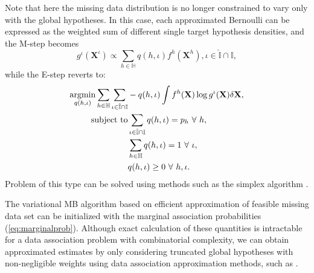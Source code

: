 \documentclass[journal]{IEEEtran}
\begin{document}
Note that here the missing data distribution is no longer constrained to vary only with the global hypotheses. In this case, each approximated Bernoulli can be expressed as the weighted sum of different single target hypothesis densities, and the M-step becomes
\begin{equation}
g^{\iota}(\mathbf{X}^{\iota}) \propto \sum_{h\in\mathbb{H}}q(h,\iota)f^h(\mathbf{X}^h), \iota\in\hat{\mathbb{I}}\cap\mathbb{I},
\label{eq:mstepjason}
\end{equation}
while the E-step reverts to:
\begin{align}
\operatornamewithlimits{argmin}_{q(h,\iota)}\sum_{h\in\mathbb{H}}\sum_{\iota\in\hat{\mathbb{I}}\cap\mathbb{I}}&-q(h,\iota)\int f^h(\mathbf{X})\log g^{\iota}(\mathbf{X})\delta \mathbf{X},\label{eq:esteplp}\\
\text{subject to}&\sum_{\iota\in\hat{\mathbb{I}}\cap\mathbb{I}}q(h,\iota) = p_h~\forall~h,\notag\\
&\sum_{h\in\mathbb{H}}q(h,\iota) = 1~\forall~\iota,\notag\\
&q(h,\iota) \geq 0~\forall~h,\iota.\notag
\end{align}
Problem of this type can be solved using methods such as the simplex algorithm \cite{simplex}. 

The variational MB algorithm based on efficient approximation of feasible missing data set can be initialized with the marginal association probabilities (\ref{eq:marginalprob}). Although exact calculation of these quantities is intractable for a data association problem with combinatorial complexity, we can obtain approximated estimates by only considering truncated global hypotheses with non-negligible weights using data association approximation methods, such as \cite{pmbmextended2,soextended}.
\end{document}
